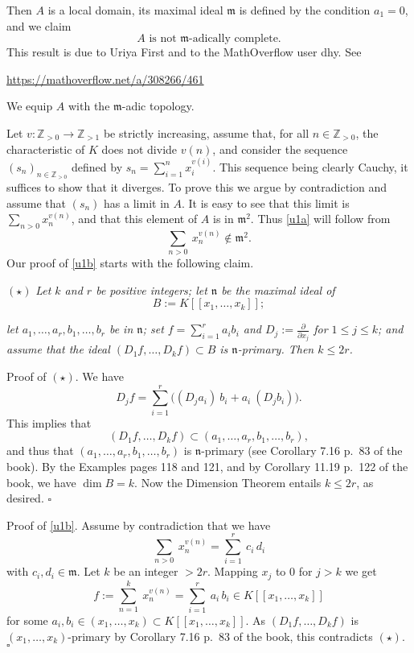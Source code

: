 \documentclass[parskip=half,fontsize=12pt]{scrartcl}%
\newcommand{\mf}{\mathfrak}
\newcommand{\mmm}{\mf m}
\begin{document}
Then $A$ is a local domain, its maximal ideal $\mathfrak m$ is defined by the condition $a_1=0$, and we claim 
\begin{equation}\label{u1a}
\boxed{A\text{ is not }\mathfrak m\text{-adically complete.}}
\end{equation}
This result is due to Uriya First and to the MathOverflow user dhy. See \\ %

\centerline{\href{https://mathoverflow.net/a/308266/461}{https://mathoverflow.net/a/308266/461}}

We equip $A$ with the $\mmm$-adic topology.

Let $v:\mathbb Z_{>0}\to\mathbb Z_{>1}$ be strictly increasing, assume that, for all $n\in\mathbb Z_{>0}$, the characteristic of $K$ does not divide $v(n)$, and consider the sequence $(s_n)_{n\in\mathbb Z_{>0}}$ defined by $s_n=\sum_{i=1}^nx_i^{v(i)}$. This sequence being clearly Cauchy, it suffices to show that it diverges. To prove this we argue by contradiction and assume that $(s_n)$ has a limit in $A$. It is easy to see that this limit is $\sum_{n>0}x_n^{v(n)}$, and that this element of $A$ is in $\mmm^2$. Thus \eqref{u1a} will follow from 
\begin{equation}\label{u1b}
\sum_{n>0}\ x_n^{v(n)}\notin\mmm^2.
\end{equation} 
Our proof of \eqref{u1b} starts with the following claim.

$(\star)$ {\em Let $k$ and $r$ be positive integers; let $\mathfrak n$ be the maximal ideal of} 
$$
B:=K[[x_1,\dots,x_k]];
$$ 

{\em let $a_1,\dots,a_r,b_1,\dots,b_r$ be in $\mathfrak n$; set $f=\sum_{i=1}^ra_ib_i$ and $D_j:=\frac{\partial}{\partial x_j}$ for $1\le j\le k$; and assume that the ideal $(D_1f,\dots,D_kf)\subset B$ is $\mathfrak n$-primary. Then $k\le2r$.}

Proof of $(\star)$. We have 
$$
D_jf=\sum_{i=1}^r\Big((D_ja_i)\ b_i+a_i\ (D_jb_i)\Big). 
$$ 
This implies that 
$$
(D_1f,\dots,D_kf)\subset(a_1,\dots,a_r,b_1,\dots,b_r),
$$ 
and thus that $(a_1,\dots,a_r,b_1,\dots,b_r)$ is $\mathfrak n$-primary (see Corollary 7.16 p.~83 of the book). By the Examples pages 118 and 121, and by Corollary 11.19 p.~122 of the book, we have $\dim B=k$. Now the Dimension Theorem entails $k\le2r$, as desired. $\square$

Proof of \eqref{u1b}. Assume by contradiction that we have 
$$
\sum_{n>0}\ x_n^{v(n)}=\sum_{i=1}^r\ c_i\,d_i
$$ 
with $c_i,d_i\in\mmm$. Let $k$ be an integer $>2r$. Mapping $x_j$ to $0$ for $j>k$ we get 
$$
f:=\sum_{n=1}^k\ x_n^{v(n)}=\sum_{i=1}^r\ a_i\,b_i\in K[[x_1,\dots,x_k]]
$$ 
for some $a_i,b_i\in(x_1,\dots,x_k)\subset K[[x_1,\dots,x_k]]$. As $(D_1f,\dots,D_kf)$ is $(x_1,\dots,x_k)$-primary by Corollary 7.16 p.~83 of the book, this contradicts $(\star)$. $\square$
\end{document}
